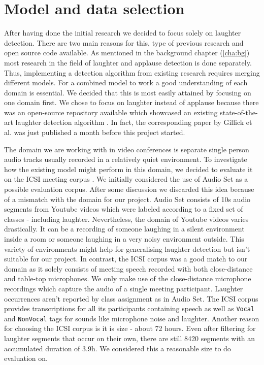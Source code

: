 \documentclass[bsc,frontabs,parskip,deptreport]{infthesis}
\begin{document}
\section{Model and data selection}\label{sec:model-and-data}
After having done the initial research we decided to focus solely on laughter detection. 
There are two main reasons for this, type of previous research and open source code available.  
As mentioned in the background chapter (\ref{cha:bg}) most research in the field of laughter and applause detection is done separately. 
Thus, implementing a detection algorithm from existing research requires merging different models. 
For a combined model to work a good understanding of each domain is essential.
We decided that this is most easily attained by focusing on one domain first. 
We chose to focus on laughter instead of applause because there was an open-source repository available which showcased an existing state-of-the-art laughter detection algorithm \citep{gillick-codebase}.
In fact, the corresponding paper by Gillick et al. \citep{gillick2021robust} was just published a month before this project started.

The domain we are working with in video conferences is separate single person audio tracks usually recorded in a relatively quiet environment.
To investigate how the existing model might perform in this domain, we decided to evaluate it on the ICSI meeting corpus \citep{morgan2001meeting}. 
We initially considered the use of Audio Set \citep{googleaudioset} as a possible evaluation corpus. After some discussion we discarded this idea because of a mismatch with the domain for our project. Audio Set  consists of 10s audio segments from Youtube videos which were labeled according to a fixed set of classes - including laughter. Nevertheless, the domain of Youtube videos varies drastically. It can be a recording of someone laughing in a silent environment inside a room or someone laughing in a very noisy environment outside. This variety of environments might help for generalising laughter detection but isn't suitable for our project.
In contrast, the ICSI corpus was a good match to our domain as it solely consists of meeting speech recorded with both close-distance and table-top microphones. 
We only make use of the close-distance microphone recordings which capture the audio of a single meeting participant.
Laughter occurrences aren't reported by class assignment as in Audio Set. The ICSI corpus provides transcriptions for all its participants containing speech as well as \texttt{Vocal} and \texttt{NonVocal} tags for sounds like microphone noise and laughter. 
Another reason for choosing the ICSI corpus is it is size - about 72 hours.
Even after filtering for laughter segments that occur on their own, there are still 8420 segments with an accumulated duration of 3.9h. 
We considered this a reasonable size to do evaluation on. 
\end{document}
